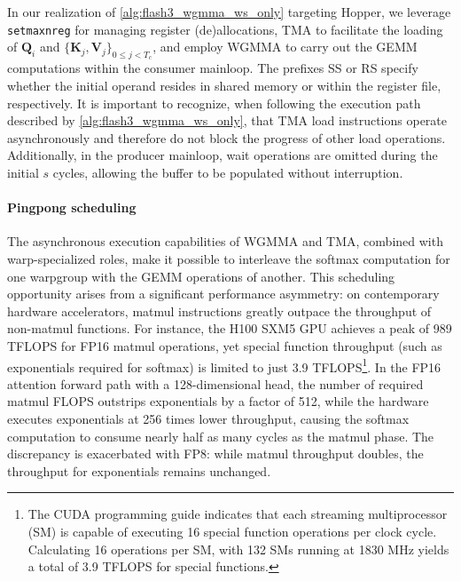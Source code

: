 In our realization of \cref{alg:flash3_wgmma_ws_only} targeting Hopper, we leverage \verb|setmaxnreg| for managing register (de)allocations, TMA to facilitate the loading of $\mathbf{Q}_i$ and $\{ \mathbf{K}_j, \mathbf{V}_j \}_{0 \leq j < T_c}$, and employ WGMMA to carry out the GEMM computations within the consumer mainloop. The prefixes SS or RS specify whether the initial operand resides in shared memory or within the register file, respectively. It is important to recognize, when following the execution path described by \cref{alg:flash3_wgmma_ws_only}, that TMA load instructions operate asynchronously and therefore do not block the progress of other load operations. Additionally, in the producer mainloop, wait operations are omitted during the initial $s$ cycles, allowing the buffer to be populated without interruption.

\paragraph{Pingpong scheduling} The asynchronous execution capabilities of WGMMA and TMA, combined with warp-specialized roles, make it possible to interleave the softmax computation for one warpgroup with the GEMM operations of another. This scheduling opportunity arises from a significant performance asymmetry: on contemporary hardware accelerators, matmul instructions greatly outpace the throughput of non-matmul functions. For instance, the H100 SXM5 GPU achieves a peak of 989 TFLOPS for FP16 matmul operations, yet special function throughput (such as exponentials required for softmax) is limited to just 3.9 TFLOPS\footnote{The CUDA programming guide indicates that each streaming multiprocessor (SM) is capable of executing 16 special function operations per clock cycle. Calculating 16 operations per SM, with 132 SMs running at 1830 MHz yields a total of 3.9 TFLOPS for special functions.}. In the FP16 attention forward path with a 128-dimensional head, the number of required matmul FLOPS outstrips exponentials by a factor of 512, while the hardware executes exponentials at 256 times lower throughput, causing the softmax computation to consume nearly half as many cycles as the matmul phase. The discrepancy is exacerbated with FP8: while matmul throughput doubles, the throughput for exponentials remains unchanged.

